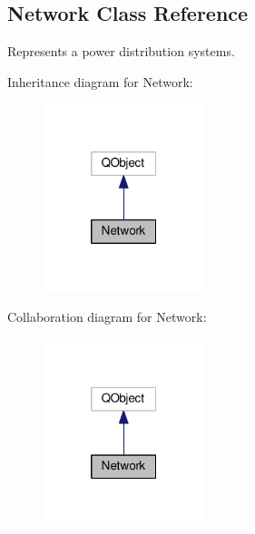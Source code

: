 \hypertarget{class_network}{}\subsection{Network Class Reference}
\label{class_network}


Represents a power distribution systems.  




Inheritance diagram for Network\+:\nopagebreak
\begin{figure}[H]
\begin{center}
\leavevmode
\includegraphics[width=133pt]{class_network__inherit__graph}
\end{center}
\end{figure}


Collaboration diagram for Network\+:\nopagebreak
\begin{figure}[H]
\begin{center}
\leavevmode
\includegraphics[width=133pt]{class_network__coll__graph}
\end{center}
\end{figure}

